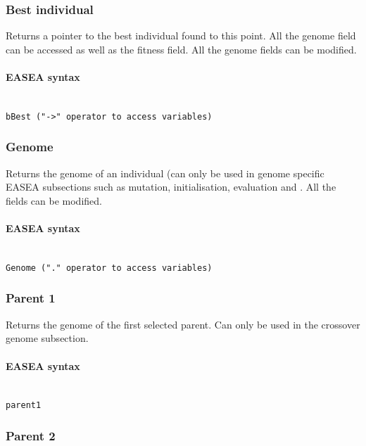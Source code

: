 \documentclass{book}
\begin{document}
\subsubsection{Best individual}\label{best-individual}

Returns a pointer to the best individual found to this point. All the
genome field can be accessed as well as the fitness field. All the
genome fields can be modified.

\paragraph{EASEA syntax}\label{easea-syntax-10}
~\\

\texttt{bBest~("-\textgreater{}"~operator~to~access~variables)}

\subsubsection{Genome}\label{genome}

Returns the genome of an individual (can only be used in genome specific
EASEA subsections such as
mutation,
initialisation,
evaluation and
. All the fields
can be modified.

\paragraph{EASEA syntax}\label{easea-syntax-11}
~\\

\texttt{Genome~("."~operator~to~access~variables)}

\subsubsection{Parent 1}\label{parent-1}

Returns the genome of the first selected parent. Can only be used in the
crossover genome
subsection.

\paragraph{EASEA syntax}\label{easea-syntax-12}
~\\

\texttt{parent1}

\subsubsection{Parent 2}\label{parent-2}
\end{document}
